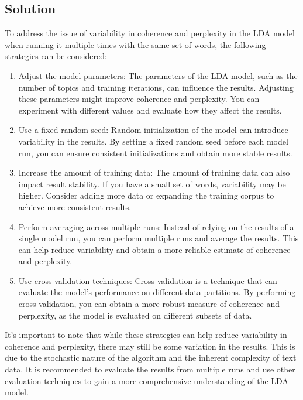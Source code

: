 \documentclass[10pt]{article} %
\begin{document}
	\subsection{Solution}
	To address the issue of variability in coherence and perplexity in the LDA model when running it multiple times with the same set of words, the following strategies can be considered:
	\begin{enumerate}
		\item Adjust the model parameters: The parameters of the LDA model, such as the number of topics and training iterations, can influence the results. Adjusting these parameters might improve coherence and perplexity. You can experiment with different values and evaluate how they affect the results.
		
		\item Use a fixed random seed: Random initialization of the model can introduce variability in the results. By setting a fixed random seed before each model run, you can ensure consistent initializations and obtain more stable results.
		
		\item Increase the amount of training data: The amount of training data can also impact result stability. If you have a small set of words, variability may be higher. Consider adding more data or expanding the training corpus to achieve more consistent results.
		
		\item Perform averaging across multiple runs: Instead of relying on the results of a single model run, you can perform multiple runs and average the results. This can help reduce variability and obtain a more reliable estimate of coherence and perplexity.
		
		\item Use cross-validation techniques: Cross-validation is a technique that can evaluate the model's performance on different data partitions. By performing cross-validation, you can obtain a more robust measure of coherence and perplexity, as the model is evaluated on different subsets of data.
	\end{enumerate}

	It's important to note that while these strategies can help reduce variability in coherence and perplexity, there may still be some variation in the results. This is due to the stochastic nature of the algorithm and the inherent complexity of text data. It is recommended to evaluate the results from multiple runs and use other evaluation techniques to gain a more comprehensive understanding of the LDA model.
	
\end{document}
